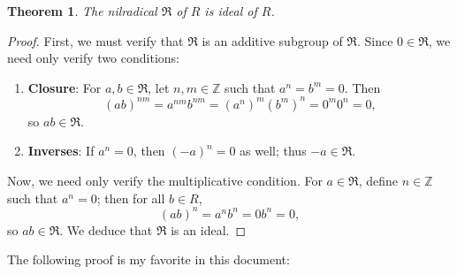 \documentclass[11pt]{article}
\newtheorem{theorem}{Theorem}
\begin{document}
\begin{adjustwidth}{0.5cm}{}
	\begin{theorem}
		The nilradical $\mathfrak{R}$ of $R$ is ideal of $R$.
	\end{theorem}
	\begin{proof}
		First, we must verify that $\mathfrak{R}$ is an additive subgroup of $\mathfrak{R}$. Since $0 \in \mathfrak{R}$, we need only verify two conditions:
		\begin{enumerate}
			\item \textbf{Closure}: For $a, b \in \mathfrak{R}$, let $n, m \in \mathbb{Z}$ such that $a^{n} = b^{m} = 0$. Then
			\[
				(ab)^{nm} = a^{nm} b^{nm} = (a^{n})^{m}(b^{m})^{n} = 0^{m}0^{n} = 0,
			\]
			so $ab \in \mathfrak{R}$.
			\item \textbf{Inverses}: If $a^{n} = 0$, then $(-a)^{n} = 0$ as well; thus $-a \in \mathfrak{R}$.
		\end{enumerate}
		Now, we need only verify the multiplicative condition. For $a \in \mathfrak{R}$, define $n \in \mathbb{Z}$ such that $a^{n} = 0$; then for all $b \in R$,
		\[
			(ab)^{n} = a^{n}b^{n} = 0b^{n} = 0,
		\]
		so $ab \in \mathfrak{R}$. We deduce that $\mathfrak{R}$ is an ideal.
	\end{proof}
\end{adjustwidth}

The following proof is my favorite in this document:
\end{document}

